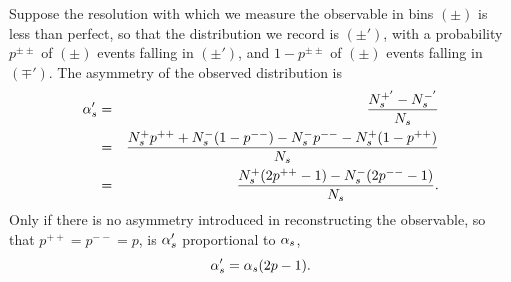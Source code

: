 \documentclass[letterpaper,11pt]{article}
\newcommand{\selected}{{\ensuremath s}}
\begin{document}
Suppose the resolution with which we measure the observable in bins
$(\pm)$ is less than perfect, so that the distribution we record is
$(\pm')$, with a probability $p^{\pm\pm}$ of $(\pm)$ events falling in
$(\pm')$, and $1-p^{\pm\pm}$ of $(\pm)$ events falling in $(\mp')$.
The asymmetry of the observed distribution is
\begin{eqnarray*}
  \alpha'_\selected 
  &=& \frac{N^{+'}_\selected-N^{-'}_\selected}{N_s}\\
  &=& \frac{N^+_\selected p^{++}+N^-_\selected(1-p^{--}) - N^-_\selected p^{--} - N^+_\selected(1-p^{++}) }{N_\selected}\\
  &=& \frac{N^+_\selected(2p^{++}-1) - N^-_\selected (2 p^{--} - 1) }{N_\selected}.
\end{eqnarray*}
Only if there is no asymmetry introduced in reconstructing the
observable, so that $p^{++}=p^{--}=p$, is $\alpha'_\selected$
proportional to $\alpha_\selected$,
\[\alpha'_\selected = \alpha_\selected(2p-1).\]
\end{document}
